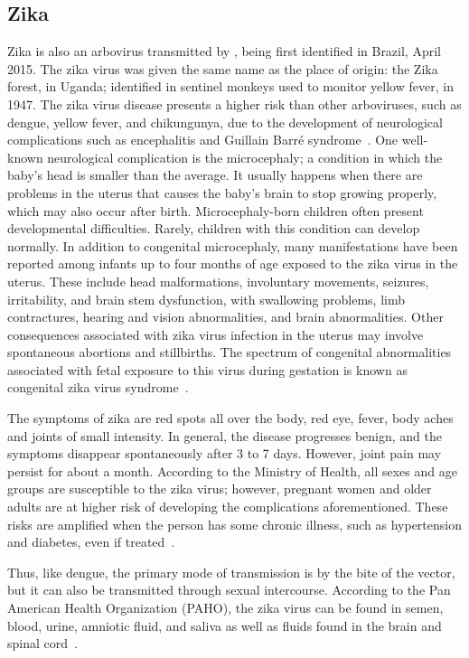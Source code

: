 \subsection{Zika}
%
Zika is also an arbovirus transmitted by \Aedes, being first identified in Brazil, April 2015.
The zika virus was given the same name as the place of origin: the Zika forest, in Uganda; identified in sentinel monkeys used to monitor yellow fever, in 1947.
The zika virus disease presents a higher risk than other arboviruses, such as dengue, yellow fever, and chikungunya, due to the development of neurological complications such as encephalitis and Guillain Barré syndrome~\cite{petersen2016zika}.
One well-known neurological complication is the microcephaly; a condition in which the baby's head is smaller than the average.
It usually happens when there are problems in the uterus that causes the baby's brain to stop growing properly, which may also occur after birth.
Microcephaly-born children often present developmental difficulties.
Rarely, children with this condition can develop normally. In addition to congenital microcephaly, many manifestations have been reported among infants up to four months of age exposed to the zika virus in the uterus.
These include head malformations, involuntary movements, seizures, irritability, and brain stem dysfunction, with swallowing problems, limb contractures, hearing and vision abnormalities, and brain abnormalities.
Other consequences associated with zika virus infection in the uterus may involve spontaneous abortions and stillbirths. The spectrum of congenital abnormalities associated with fetal exposure to this virus during gestation is known as congenital zika virus syndrome~\cite{web:who2016zika}.

The symptoms of zika are red spots all over the body, red eye, fever, body aches and joints of small intensity.
In general, the disease progresses benign, and the symptoms disappear spontaneously after 3 to 7 days.
However, joint pain may persist for about a month.
According to the Ministry of Health, all sexes and age groups are susceptible to the zika virus; however, pregnant women and older adults are at higher risk of developing the complications aforementioned.
These risks are amplified when the person has some chronic illness, such as hypertension and diabetes, even if treated~\cite{PAHO2017zika}.

Thus, like dengue, the primary mode of transmission is by the bite of the vector, but it can also be transmitted through sexual intercourse.
According to the Pan American Health Organization (PAHO),
the zika virus can be found in semen, blood, urine, amniotic fluid, and saliva as well as fluids found in the brain and spinal cord~\cite{PAHO2017zika}.


